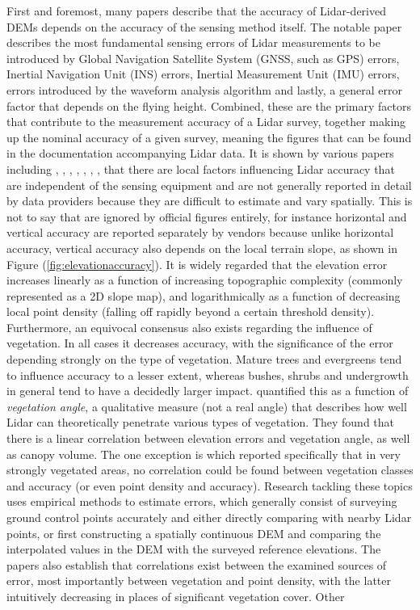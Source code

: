 First and foremost, many papers describe that the accuracy of Lidar-derived DEMs depends on the accuracy of the sensing method itself. The notable paper \cite{hodgson_breshanan_2004} describes the most fundamental sensing errors of Lidar measurements to be introduced by Global Navigation Satellite System (GNSS, such as GPS) errors, Inertial Navigation Unit (INS) errors, Inertial Measurement Unit (IMU) errors, errors introduced by the waveform analysis algorithm and lastly, a general error factor that depends on the flying height. Combined, these are the primary factors that contribute to the measurement accuracy of a Lidar survey, together making up the nominal accuracy of a given survey, meaning the figures that can be found in the documentation accompanying Lidar data. It is shown by various papers including \cite{hodgson_breshanan_2004}, \cite{su_bork_2006}, \cite{kraus_etal_2006}, \cite{raber_etal_2007}, \cite{peng_shih_2006}, \cite{chow_hodgson_2009}, \cite{aguilar_etal_2005}, \cite{aguilar_etal_2010} \cite{guo_etal_2010} that there are local factors influencing Lidar accuracy that are independent of the sensing equipment and are not generally reported in detail by data providers because they are difficult to estimate and vary spatially. This is not to say that are ignored by official figures entirely, for instance horizontal and vertical accuracy are reported separately by vendors because unlike horizontal accuracy, vertical accuracy also depends on the local terrain slope, as shown in Figure (\ref{fig:elevationaccuracy}). It is widely regarded that the elevation error increases linearly as a function of increasing topographic complexity (commonly represented as a 2D slope map), and logarithmically as a function of decreasing local point density (falling off rapidly beyond a certain threshold density). Furthermore, an equivocal consensus also exists regarding the influence of vegetation. In all cases it decreases accuracy, with the significance of the error depending strongly on the type of vegetation. Mature trees and evergreens tend to influence accuracy to a lesser extent, whereas bushes, shrubs and undergrowth in general tend to have a decidedly larger impact. \cite{peng_shih_2006} quantified this as a function of \textit{vegetation angle}, a qualitative measure (not a real angle) that describes how well Lidar can theoretically penetrate various types of vegetation. They found that there is a linear correlation between elevation errors and vegetation angle, as well as canopy volume. The one exception is \cite{raber_etal_2007} which reported specifically that in very strongly vegetated areas, no correlation could be found between vegetation classes and accuracy (or even point density and accuracy). Research tackling these topics uses empirical methods to estimate errors, which generally consist of surveying ground control points accurately and either directly comparing with nearby Lidar points, or first constructing a spatially continuous DEM and comparing the interpolated values in the DEM with the surveyed reference elevations. The papers also establish that correlations exist between the examined sources of error, most importantly between vegetation and point density, with the latter intuitively decreasing in places of significant vegetation cover. Other 